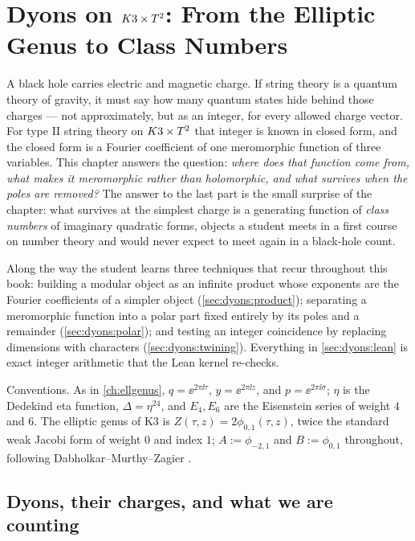 \chapter{Dyons on \texorpdfstring{$K3\times T^2$}{K3 x T2}: From the Elliptic Genus to Class Numbers}\label{ch:dyons}

A black hole carries electric and magnetic charge. If string theory is a quantum theory of
gravity, it must say how many quantum states hide behind those charges --- not approximately,
but as an integer, for every allowed charge vector. For type II string theory on $K3\times T^2$ that
integer is known in closed form, and the closed form is a Fourier coefficient of one
meromorphic function of three variables. This chapter answers the question: \emph{where does
that function come from, what makes it meromorphic rather than holomorphic, and what survives
when the poles are removed?} The answer to the last part is the small surprise of the chapter:
what survives at the simplest charge is a generating function of \emph{class numbers} of
imaginary quadratic forms, objects a student meets in a first course on number theory and
would never expect to meet again in a black-hole count.

Along the way the student learns three techniques that recur throughout this book: building a
modular object as an infinite product whose exponents are the Fourier coefficients of a
simpler object (\cref{sec:dyons:product}); separating a meromorphic function into a polar part
fixed entirely by its poles and a remainder (\cref{sec:dyons:polar}); and testing an integer
coincidence by replacing dimensions with characters (\cref{sec:dyons:twining}). Everything in
\cref{sec:dyons:lean} is exact integer arithmetic that the Lean kernel re-checks.

Conventions. As in \cref{ch:ellgenus}, $q=\ee^{2\pi\ii\tau}$, $y=\ee^{2\pi\ii z}$, and
$p=\ee^{2\pi\ii\sigma}$; $\eta$ is the Dedekind eta function, $\Delta=\eta^{24}$, and
$E_4,E_6$ are the Eisenstein series of weight $4$ and $6$. The elliptic genus of K3 is
$Z(\tau,z)=2\phi_{0,1}(\tau,z)$, twice the standard weak Jacobi form of weight $0$ and index
$1$; $A:=\phi_{-2,1}$ and $B:=\phi_{0,1}$ throughout, following
Dabholkar--Murthy--Zagier .

\section{Dyons, their charges, and what we are counting}\label{sec:dyons:charges}

